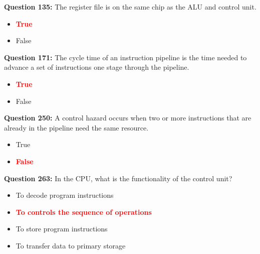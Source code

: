 \documentclass[12pt,a4paper]{article}
\begin{document}
\vspace{0.5cm}

\vspace{0.5cm}

\textbf{Question 135:} The register file is on the same chip as the ALU and control unit.

\begin{itemize}
    \item[\textbf{A.}] \textcolor{red}{\textbf{True}}
    \item[\textbf{B.}] False
\end{itemize}

\vspace{0.5cm}

\vspace{0.5cm}

\textbf{Question 171:} The cycle time of an instruction pipeline is the time needed to advance a set of instructions one stage through the pipeline.

\begin{itemize}
    \item[\textbf{A.}] \textcolor{red}{\textbf{True}}
    \item[\textbf{B.}] False
\end{itemize}

\vspace{0.5cm}

\vspace{0.5cm}

\textbf{Question 250:} A control hazard occurs when two or more instructions that are already in the pipeline need the same resource.

\begin{itemize}
    \item[\textbf{A.}] True
    \item[\textbf{B.}] \textcolor{red}{\textbf{False}}
\end{itemize}

\vspace{0.5cm}

\vspace{0.5cm}

\textbf{Question 263:} In the CPU, what is the functionality of the control unit?

\begin{itemize}
    \item[\textbf{A.}] To decode program instructions
    \item[\textbf{B.}] \textcolor{red}{\textbf{To controls the sequence of operations}}
    \item[\textbf{C.}] To store program instructions
    \item[\textbf{D.}] To transfer data to primary storage
\end{itemize}
\end{document}
